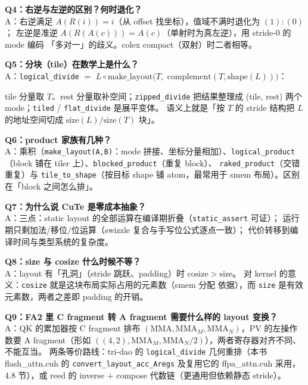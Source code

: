 \textbf{Q4：右逆与左逆的区别？何时退化？}\\
A：右逆满足 $A(R(i))=i$（从 offset 找坐标），值域不满时退化为 $(1){:}(0)$；
左逆是准逆 $A(R(A(c)))=A(c)$（单射时为真左逆），用 stride-0 的 mode 编码
「多对一」的歧义。colex compact（双射）时二者相等。

\textbf{Q5：分块（tile）在数学上是什么？}\\
A：\texttt{logical\_\allowbreak{}divide} $=$
$L\circ\mathrm{make\_layout}\bigl(T,$
$\mathrm{complement}(T,\mathrm{shape}(L))\bigr)$：
\begin{sloppypar}
tile 分量取 $T$、rest 分量取补空间；\texttt{zipped\_\allowbreak{}divide} 把结果整理成
(tile, rest) 两个 mode；\texttt{tiled} / \texttt{flat\_divide} 是展平变体。
语义上就是「按 $T$ 的 stride 结构把 $L$ 的地址空间切成
$\mathrm{size}(L)/\mathrm{size}(T)$ 块」。
\end{sloppypar}

\textbf{Q6：product 家族有几种？}\\
A：乘积（\texttt{make\_\allowbreak{}layout\allowbreak{}(A,\allowbreak{}B)}：mode 拼接、坐标分量相加）、\texttt{logical\_\allowbreak{}product}
（block 铺在 tiler 上）、\texttt{blocked\_\allowbreak{}product}（重复 block）、
\texttt{raked\_\allowbreak{}product}（交错重复）与 \texttt{tile\_\allowbreak{}to\_\allowbreak{}shape}（按目标 shape
铺 atom，最常用于 smem 布局）。区别在「block 之间怎么排」。

\textbf{Q7：为什么说 CuTe 是零成本抽象？}\\
A：三点：static layout 的全部运算在编译期折叠（\texttt{static\_\allowbreak{}assert} 可证）；
运行期只剩加法/移位/位运算（swizzle 复合与手写位公式逐点一致）；
代价转移到编译时间与类型系统的复杂度。

\textbf{Q8：size 与 cosize 什么时候不等？}\\
A：layout 有「孔洞」（stride 跳跃、padding）时 $\mathrm{cosize}>\mathrm{size}$。
对 kernel 的意义：\texttt{cosize} 就是这块布局实际占用的元素数（smem 分配
依据），而 \texttt{size} 是有效元素数，两者之差即 padding 的开销。

\begin{sloppypar}
\textbf{Q9：FA2 里 C fragment 转 A fragment 需要什么样的 layout 变换？}\\
A：QK 的累加器按 C fragment 排布 $(\mathrm{MMA},\mathrm{MMA}_M,
\mathrm{MMA}_N)$，PV 的左操作数要 A fragment（形如
$((4,2),\mathrm{MMA}_M,\mathrm{MMA}_N/2)$），两者寄存器对齐不同、不能互当。
两条等价路线：tri-dao 的 \texttt{logical\_\allowbreak{}divide} 几何重排（本书
flash\_attn.cuh 的 \texttt{convert\_\allowbreak{}layout\_\allowbreak{}}\allowbreak\texttt{acc\_Aregs}
及复用它的 ffpa\_attn.cuh 采用，4.8 节），或 reed 的 inverse $+$ compose
代数链（更通用但依赖静态 stride）。
\end{sloppypar}

